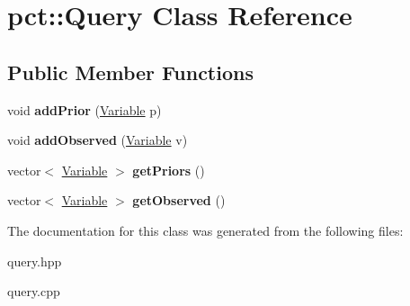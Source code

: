 \hypertarget{classpct_1_1_query}{\section{pct\-:\-:Query Class Reference}
\label{classpct_1_1_query}
}
\subsection*{Public Member Functions}
\begin{DoxyCompactItemize}
\item 
\hypertarget{classpct_1_1_query_addb0cd6c29bd072abf67bb309b1dc1f9}{void {\bfseries add\-Prior} (\hyperlink{classpct_1_1_variable}{Variable} p)}\label{classpct_1_1_query_addb0cd6c29bd072abf67bb309b1dc1f9}

\item 
\hypertarget{classpct_1_1_query_a1a17ddb83e690261ac96e67f7081d680}{void {\bfseries add\-Observed} (\hyperlink{classpct_1_1_variable}{Variable} v)}\label{classpct_1_1_query_a1a17ddb83e690261ac96e67f7081d680}

\item 
\hypertarget{classpct_1_1_query_a0c4b538c169d55d3e015c09406f82a87}{vector$<$ \hyperlink{classpct_1_1_variable}{Variable} $>$ {\bfseries get\-Priors} ()}\label{classpct_1_1_query_a0c4b538c169d55d3e015c09406f82a87}

\item 
\hypertarget{classpct_1_1_query_aed301a3134c049b1299de48d67900b43}{vector$<$ \hyperlink{classpct_1_1_variable}{Variable} $>$ {\bfseries get\-Observed} ()}\label{classpct_1_1_query_aed301a3134c049b1299de48d67900b43}

\end{DoxyCompactItemize}


The documentation for this class was generated from the following files\-:\begin{DoxyCompactItemize}
\item 
query.\-hpp\item 
query.\-cpp\end{DoxyCompactItemize}
